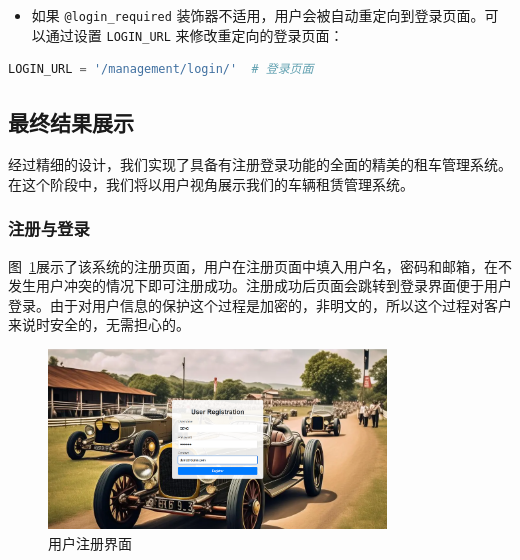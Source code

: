 \documentclass[UTF8,a4paper,12pt]{ctexart}
\begin{document}
\begin{itemize}
    \item 如果 \texttt{@login\_required} 装饰器不适用，用户会被自动重定向到登录页面。可以通过设置 \texttt{LOGIN\_URL} 来修改重定向的登录页面：
\end{itemize}

\begin{lstlisting}[language=Python]
LOGIN_URL = '/management/login/'  # 登录页面
\end{lstlisting}

\subsection{最终结果展示}
经过精细的设计，我们实现了具备有注册登录功能的全面的精美的租车管理系统。在这个阶段中，我们将以用户视角展示我们的车辆租赁管理系统。
\subsubsection{注册与登录}
图~\ref{fig:reg}展示了该系统的注册页面，用户在注册页面中填入用户名，密码和邮箱，在不发生用户冲突的情况下即可注册成功。注册成功后页面会跳转到登录界面便于用户登录。由于对用户信息的保护这个过程是加密的，非明文的，所以这个过程对客户来说时安全的，无需担心的。
\begin{figure}[htbp]  %
    \centering  %
    \includegraphics[width=0.8\textwidth]{pic/reg.png}
    \caption{用户注册界面}  %
    \label{fig:reg}  %
\end{figure}
\end{document}

